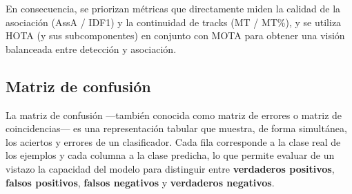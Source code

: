  En consecuencia, se priorizan métricas que directamente miden la calidad de la asociación (AssA / IDF1) y la continuidad de tracks (MT / MT\%), y se utiliza HOTA (y sus subcomponentes) en conjunto con MOTA para obtener una visión balanceada entre detección y asociación.

\subsection{Matriz de confusión}
La matriz de confusión ---también conocida como matriz de errores o matriz de coincidencias--- es una representación tabular que muestra, de forma simultánea, los aciertos y errores de un clasificador. Cada fila corresponde a la clase real de los ejemplos y cada columna a la clase predicha, lo que permite evaluar de un vistazo la capacidad del modelo para distinguir entre \textbf{verdaderos positivos}, \textbf{falsos positivos}, \textbf{falsos negativos} y \textbf{verdaderos negativos}.


